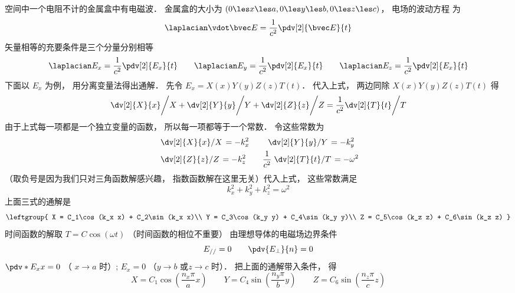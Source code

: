 
空间中一个电阻不计的金属盒中有电磁波． 金属盒的大小为 $(0 \les x \les a, 0 \les y \les b, 0 \les z \les c)$， 电场的波动方程%
为
\begin{equation}
\laplacian \vdot \bvec E = \frac{1}{c^2} \pdv[2]{\bvec E}{t}
\end{equation}  
矢量相等的充要条件是三个分量分别相等
\begin{equation}
\laplacian E_x = \frac{1}{c^2} \pdv[2]{E_x}{t} \qquad
\laplacian E_y = \frac{1}{c^2} \pdv[2]{E_x}{t} \qquad
\laplacian E_z = \frac{1}{c^2} \pdv[2]{E_x}{t}
\end{equation}   
下面以 $E_x$ 为例， 用分离变量法得出通解．
先令 $E_x = X(x) Y(y) Z(z) T(t)$． 代入上式， 两边同除 $X(x) Y(y) Z(z) T(t)$ 得
\begin{equation}
\left. \dv[2]{X}{x} \middle/ X + \dv[2]{Y}{y} \middle/ Y + \dv[2]{Z}{z} \middle/ Z  = \frac{1}{c^2}  \dv[2]{T}{t} \middle/ T\right.
\end{equation}
由于上式每一项都是一个独立变量的函数， 所以每一项都等于一个常数． 令这些常数为
\begin{equation}\begin{aligned}
&\left. \dv[2]{X}{x} \middle/ X \right. = -k_x^2 \qquad
\left. \dv[2]{Y}{y} \middle/ Y \right. = -k_y^2\\
&\left. \dv[2]{Z}{z} \middle/ Z \right. = -k_z^2 \qquad
\frac{1}{c^2} \left. \dv[2]{T}{t} \middle/ T \right. = -\omega^2
\end{aligned}\end{equation}
（取负号是因为我们只对三角函数解感兴趣， 指数函数解在这里无关）代入上式， 这些常数满足
\begin{equation}
k_x^2 + k_y^2 + k_z^2 = \omega ^2
\end{equation} 
上面三式的通解是
\begin{equation}
\leftgroup{
X = C_1\cos(k_x x) + C_2\sin(k_x x)\\
Y = C_3\cos(k_y y) + C_4\sin(k_y y)\\
Z = C_5\cos(k_z z) + C_6\sin(k_z z)
}\end{equation} 
时间函数的解取 $T = C\cos(\omega t)$ （时间函数的相位不重要）
由理想导体的电磁场边界条件%
\begin{equation}
E_{//} = 0  \qquad  \pdv{E_\bot}{n} = 0
\end{equation}  
$\pdv*{E_x}{x} = 0$ （ $x \to a$ 时）;  $E_x = 0$ （$y \to b$ 或$z \to c$ 时）． 把上面的通解带入条件， 得
\begin{equation}
X = C_1\cos(\frac{n_x \pi}{a} x)
\qquad
Y = C_4\sin(\frac{n_y \pi}{b} y)
\qquad
Z = C_6\sin(\frac{n_z \pi}{c} z)
\end{equation}  
